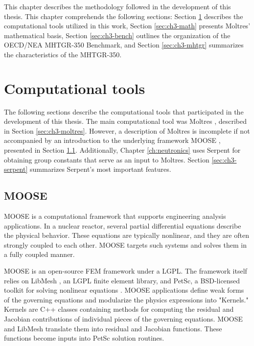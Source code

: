 
This chapter describes the methodology followed in the development of this thesis.
This chapter comprehends the following sections: Section \ref{sec:ch3-tools} describes the computational tools utilized in this work, Section \ref{sec:ch3-math} presents Moltres' mathematical basis, Section \ref{sec:ch3-bench} outlines the organization of the OECD/NEA MHTGR-350 Benchmark, and Section \ref{sec:ch3-mhtgr} summarizes the characteristics of the MHTGR-350.

\section{Computational tools}
\label{sec:ch3-tools}

The following sections describe the computational tools that participated in the development of this thesis.
The main computational tool was Moltres \cite{lindsay_introduction_2018}, described in Section \ref{sec:ch3-moltres}.
However, a description of Moltres is incomplete if not accompanied by an introduction to the underlying framework MOOSE \cite{gaston_moose_2009}, presented in Section \ref{sec:ch3-moose}.
Additionally, Chapter \ref{ch:neutronics} uses Serpent \cite{leppanen_development_2007}\cite{leppanen_calculation_2014} for obtaining group constants that serve as an input to Moltres. Section \ref{sec:ch3-serpent} summarizes Serpent's most important features.

\subsection{MOOSE}
\label{sec:ch3-moose}

MOOSE is a computational framework that supports engineering analysis applications.
In a nuclear reactor, several partial differential equations describe the physical behavior.
These equations are typically nonlinear, and they are often strongly coupled to each other.
\gls{MOOSE} targets such systems and solves them in a fully coupled manner.

\gls{MOOSE} is an open-source FEM framework under a \gls{LGPL}.
The framework itself relies on LibMesh \cite{kirk_libmesh_2006}, an LGPL finite element library, and PetSc, a \gls{BSD}-licensed toolkit for solving nonlinear equations \cite{balay_petsc_2016}.
MOOSE applications define weak forms of the governing equations and modularize the physics expressions into "Kernels."
Kernels are C++ classes containing methods for computing the residual and Jacobian contributions of individual pieces of the governing equations.
\gls{MOOSE} and LibMesh translate them into residual and Jacobian functions.
These functions become inputs into PetSc solution routines.

